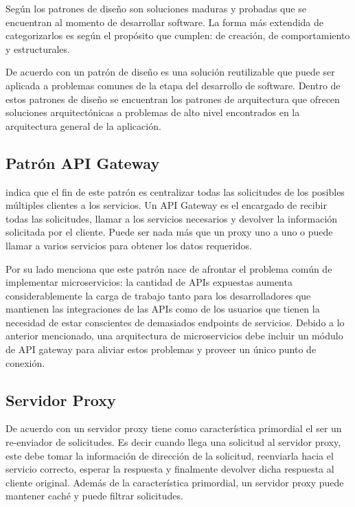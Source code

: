Según \cite{cosmin2016patrones} los patrones de diseño son soluciones maduras y probadas que
se encuentran al momento de desarrollar software.
La forma más extendida de categorizarlos es según el propósito que cumplen: de creación, de comportamiento
y estructurales.

De acuerdo con \cite{lo2022architectural} un patrón de diseño es una solución reutilizable que puede
ser aplicada a problemas comunes de la etapa del desarrollo de software.
Dentro de estos patrones de diseño se encuentran los patrones de arquitectura que ofrecen soluciones
arquitectónicas a problemas de alto nivel encontrados en la arquitectura general de la aplicación.

\subsection{Patrón API Gateway}

\cite{trebichavsky2021api} indica que el fin de este patrón es centralizar todas las solicitudes
de los posibles múltiples clientes a los servicios.
Un API Gateway es el encargado de recibir todas las solicitudes, llamar a los servicios necesarios
y devolver la información solicitada por el cliente.
Puede ser nada más que un proxy uno a uno o puede llamar a varios servicios para obtener los datos 
requeridos.

Por su lado \cite{tomic2022towards} menciona que este patrón nace de afrontar el problema común
de implementar microservicios: la cantidad de APIs expuestas aumenta considerablemente la carga de trabajo
tanto para los desarrolladores que mantienen las integraciones de las APIs como de los usuarios que
tienen la necesidad de estar conscientes de demasiados endpoints de servicios.
Debido a lo anterior mencionado, una arquitectura de microservicios debe incluir un módulo de 
API gateway para aliviar estos problemas y proveer un único punto de conexión.
  

\subsection{Servidor Proxy}

De acuerdo con \cite{wenceslao2022network} un servidor proxy tiene como característica primordial el ser
un re-enviador de solicitudes.
Es decir cuando llega una solicitud al servidor proxy, este debe tomar la información de dirección
de la solicitud, reenviarla hacia el servicio correcto, esperar la respuesta y finalmente devolver
dicha respuesta al cliente original.
Además de la característica primordial, un servidor proxy puede mantener caché y puede filtrar solicitudes.

